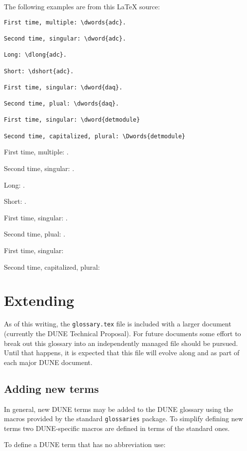\documentclass{article}
\begin{document}
The following examples are from this \LaTeX{} source:
\begin{verbatim}
First time, multiple: \dwords{adc}.

Second time, singular: \dword{adc}.

Long: \dlong{adc}.

Short: \dshort{adc}.

First time, singular: \dword{daq}.

Second time, plual: \dwords{daq}.

First time, singular: \dword{detmodule}

Second time, capitalized, plural: \Dwords{detmodule}
\end{verbatim}

First time, multiple: .

Second time, singular: .

Long: .

Short: .

First time, singular: .

Second time, plual: .

First time, singular: 

Second time, capitalized, plural: 



\section{Extending}

As of this writing, the \texttt{glossary.tex} file is included with a
larger document (currently the DUNE Technical Proposal). 
For future documents some effort to break out this glossary into an
independently managed file should be pursued. 
Until that happens, it is expected that this file will evolve along
and as part of each major DUNE document.

\subsection{Adding new terms}

In general, new DUNE terms may be added to the DUNE glossary using the
macros provided by the standard \texttt{glossaries} package. 
To simplify defining new terms two DUNE-specific macros are defined in
terms of the standard ones.

\noindent To define a DUNE term that has no abbreviation use:
\end{document}
